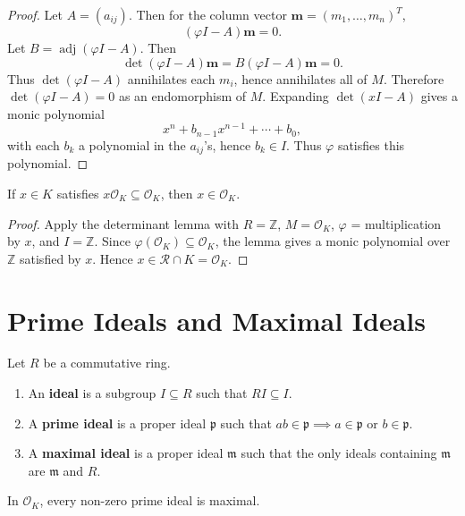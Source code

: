 \begin{proof}
Let \(A = (a_{ij})\). Then for the column vector \(\mathbf{m} = (m_1, \dots, m_n)^T\),
\[
(\varphi I - A)\mathbf{m} = 0.
\]
Let \(B = \operatorname{adj}(\varphi I - A)\). Then
\[
\det(\varphi I - A) \mathbf{m} = B(\varphi I - A)\mathbf{m} = 0.
\]
Thus \(\det(\varphi I - A)\) annihilates each \(m_i\), hence annihilates all of \(M\). Therefore \(\det(\varphi I - A) = 0\) as an endomorphism of \(M\). Expanding \(\det(xI - A)\) gives a monic polynomial
\[
x^n + b_{n-1}x^{n-1} + \cdots + b_0,
\]
with each \(b_k\) a polynomial in the \(a_{ij}\)'s, hence \(b_k \in I\). Thus \(\varphi\) satisfies this polynomial.
\end{proof}

\begin{cor}
If \(x \in K\) satisfies \(x \mathcal{O}_K \subseteq \mathcal{O}_K\), then \(x \in \mathcal{O}_K\).
\end{cor}

\begin{proof}
Apply the determinant lemma with \(R = \mathbb{Z}\), \(M = \mathcal{O}_K\), \(\varphi\) = multiplication by \(x\), and \(I = \mathbb{Z}\). Since \(\varphi(\mathcal{O}_K) \subseteq \mathcal{O}_K\), the lemma gives a monic polynomial over \(\mathbb{Z}\) satisfied by \(x\). Hence \(x \in \mathcal{R} \cap K = \mathcal{O}_K\).
\end{proof}


\section{Prime Ideals and Maximal Ideals}

\begin{defn}
Let \(R\) be a commutative ring.
\begin{enumerate}
    \item An \textbf{ideal} is a subgroup \(I \subseteq R\) such that \(R I \subseteq I\).
    \item A \textbf{prime ideal} is a proper ideal \(\mathfrak{p}\) such that \(ab \in \mathfrak{p} \implies a \in \mathfrak{p}\) or \(b \in \mathfrak{p}\).
    \item A \textbf{maximal ideal} is a proper ideal \(\mathfrak{m}\) such that the only ideals containing \(\mathfrak{m}\) are \(\mathfrak{m}\) and \(R\).
\end{enumerate}
\end{defn}

\begin{prop}
In \(\mathcal{O}_K\), every non-zero prime ideal is maximal.
\end{prop}

